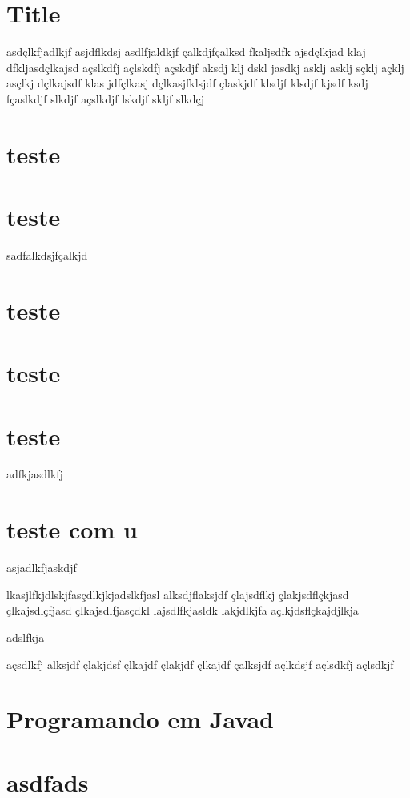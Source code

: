\documentclass{rcarcard}
\begin{document}
\flushbottom

\maketitle

\section{Title}

asdçlkfjadlkjf asjdflkdsj asdlfjaldkjf çalkdjfçalksd fkaljsdfk ajsdçlkjad klaj dfkljasdçlkajsd açslkdfj açlskdfj açskdjf aksdj klj dskl jasdkj asklj asklj sçklj açklj asçlkj dçlkajsdf klas jdfçlkasj dçlkasjfklsjdf çlaskjdf klsdjf klsdjf kjsdf ksdj fçaslkdjf slkdjf açslkdjf lskdjf skljf slkdçj

\section{teste}
\lipsum[1-4]

\section{teste}

sadfalkdsjfçalkjd

\section{teste}

\section{teste}


\section{teste}

adfkjasdlkfj


\section{teste com u}


asjadlkfjaskdjf


lkasjlfkjdlskjfasçdlkjkjadslkfjasl 
alksdjflaksjdf
 çlajsdflkj
  çlakjsdflçkjasd
   çlkajsdlçfjasd
    çlkajsdlfjasçdkl 
    lajsdlfkjasldk 
    lakjdlkjfa
    açlkjdsflçkajdjlkja



    adslfkja


     açsdlkfj
     alksjdf
     çlakjdsf
     çlkajdf
     çlakjdf
     çlkajdf
     çalksjdf
     açlkdsjf
     açlsdkfj
     açlsdkjf

\section{Programando em Javad}

\lipsum[1-8]

\section{asdfads}
\end{document}

